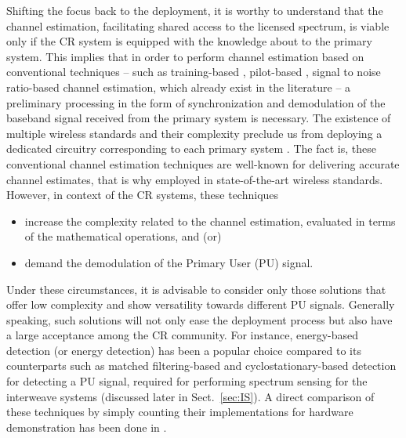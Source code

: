 Shifting the focus back to the deployment, it is worthy to understand that the channel estimation, facilitating shared access to the licensed spectrum, is viable only if the CR system is equipped with the knowledge about to the primary system. %
This implies that in order to perform channel estimation based on conventional techniques -- such as training-based \cite{Stoica03}, pilot-based \cite{Gifford05, Gifford08}, signal to noise ratio-based \cite{Chav11, Sharma13} channel estimation, which already exist in the literature -- a preliminary processing in the form of synchronization and demodulation of the baseband signal received from the primary system is necessary. The existence of multiple wireless standards and their complexity preclude us from deploying a dedicated circuitry corresponding to each primary system \cite{Ghasemi08_cm}. The fact is, these conventional channel estimation techniques are well-known for delivering accurate channel estimates, that is why employed in state-of-the-art wireless standards. However, in context of the CR systems, these techniques \begin{itemize} \item increase the complexity related to the channel estimation, evaluated in terms of the mathematical operations, and (or) \item demand the demodulation of the Primary User (PU) signal. \end{itemize}

Under these circumstances, it is advisable to consider only those solutions that offer low complexity and show versatility towards different PU signals. Generally speaking, such solutions will not only ease the deployment process but also have a large acceptance among the CR community. For instance, energy-based detection (or energy detection) has been a popular choice compared to its counterparts such as matched filtering-based and cyclostationary-based detection for detecting a PU signal, required for performing spectrum sensing for the interweave systems (discussed later in Sect.~\ref{sec:IS}). A direct comparison of these techniques by simply counting their implementations for hardware demonstration has been done in \cite{Pawe11}.

